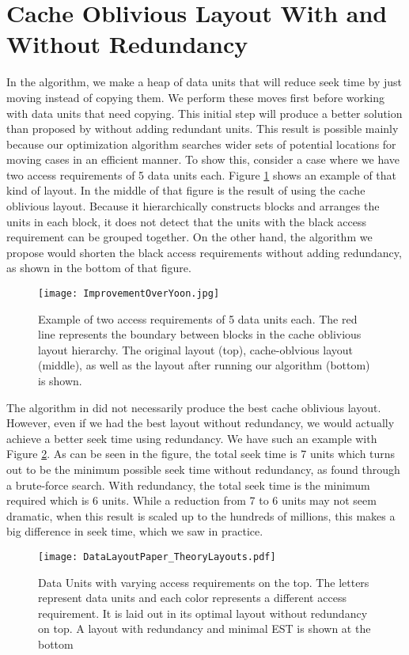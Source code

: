 
\section{Cache Oblivious Layout With and Without Redundancy}

In the algorithm, we make a heap of data units that will reduce seek time by
just moving instead of copying them. We perform these moves first before
working with data units that need copying. This initial step will produce a
better solution than proposed by \cite{cacheobliviouslayout} without adding
redundant units. This result is possible mainly because our optimization
algorithm searches wider sets of potential locations for moving cases in an
efficient manner.
To show this, consider a case where we have two
access requirements of 5 data units each. Figure \ref{YoonImprovement} shows an
example of that kind of layout. In the middle of that figure is the result of
using the cache oblivious layout. Because it hierarchically constructs blocks
and arranges the units in each block, it does
not detect that the
units with the black access requirement can be grouped together. On the other
hand, the algorithm we propose would shorten the black access requirements
without adding redundancy, as shown in the bottom of that figure.

\begin{figure}[ht]
\centering
\texttt{[image: ImprovementOverYoon.jpg]}
\caption{Example of two access requirements of 5 data units each. The red line represents the boundary between blocks in the cache oblivious layout hierarchy. The original layout (top), cache-oblvious layout (middle), as well as the layout after running our algorithm (bottom) is shown.}
\label{YoonImprovement}
\end{figure}

The algorithm in \cite{cacheobliviouslayout} did not necessarily produce the best cache oblivious layout. However, even if we had the best layout without redundancy, we would actually achieve a better seek time using redundancy. We have such an example with Figure \ref{fig:startingProb}. As can be seen in the figure, the total seek time is 7 units which turns out to be the minimum possible seek time without redundancy, as found through a brute-force search. With redundancy, the total seek time is the minimum required which is 6 units. While a reduction from 7 to 6 units may not seem dramatic, when this result is scaled up to the hundreds of millions, this makes a big difference in seek time, which we saw in practice.\\

\begin{figure}[h!]
\centering
\texttt{[image: DataLayoutPaper\_TheoryLayouts.pdf]}
\caption{Data Units with varying access requirements on the top. The letters represent data units and each color represents a different access requirement. It is laid out in its optimal layout without redundancy on top. A layout with redundancy and minimal EST is shown at the bottom}
\label{fig:startingProb}
\end{figure}


